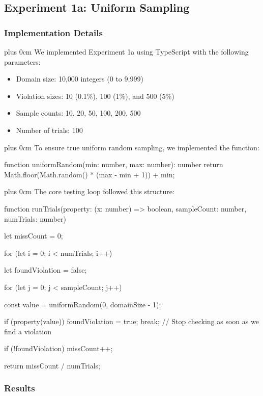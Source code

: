 \documentclass[conference]{IEEEtran}
\newcommand{\justifytext}{\leftskip=0pt \rightskip=0pt plus 0cm}
\begin{document}
\subsection{Experiment 1a: Uniform Sampling}
\label{subsec:experiment1a}

\subsubsection{Implementation Details}

\justifytext
We implemented Experiment 1a using TypeScript with the following parameters:

\begin{itemize}
\item Domain size: 10,000 integers (0 to 9,999)
\item Violation sizes: 10 (0.1\%), 100 (1\%), and 500 (5\%)
\item Sample counts: 10, 20, 50, 100, 200, 500
\item Number of trials: 100
\end{itemize}

\justifytext
To ensure true uniform random sampling, we implemented the function:

\begin{wrappedcode}
function uniformRandom(min: number, max: number): number {
  return Math.floor(Math.random() * (max - min + 1)) + min;
}
\end{wrappedcode}

\justifytext
The core testing loop followed this structure:

\begin{wrappedcode}
function runTrials(property: (x: number) => boolean, sampleCount: number, numTrials: number) {
  let missCount = 0;

  for (let i = 0; i < numTrials; i++) {
    let foundViolation = false;
    
    for (let j = 0; j < sampleCount; j++) {
      const value = uniformRandom(0, domainSize - 1);
      
      if (property(value)) {
        foundViolation = true;
        break; // Stop checking as soon as we find a violation
      }
    }
    
    if (!foundViolation) {
      missCount++;
    }
  }

  return missCount / numTrials;
}
\end{wrappedcode}

\subsubsection{Results}
\end{document}
